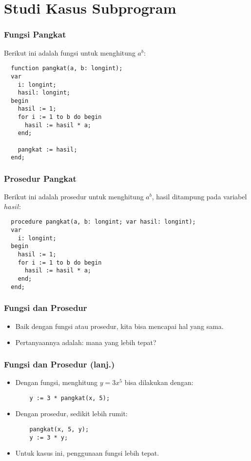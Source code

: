 \documentclass{beamer}
\begin{document}
\section{Studi Kasus Subprogram}
\frame{\sectionpage}

\begin{frame}[fragile]
\frametitle{Fungsi Pangkat}
Berikut ini adalah fungsi untuk menghitung $a^b$:
\begin{lstlisting}
  function pangkat(a, b: longint);
  var
    i: longint;
    hasil: longint;
  begin
    hasil := 1;
    for i := 1 to b do begin
      hasil := hasil * a;
    end;

    pangkat := hasil;
  end;
\end{lstlisting}
\end{frame}

\begin{frame}[fragile]
\frametitle{Prosedur Pangkat}
Berikut ini adalah prosedur untuk menghitung $a^b$, hasil ditampung pada variabel $hasil$:
\begin{lstlisting}
  procedure pangkat(a, b: longint; var hasil: longint);
  var
    i: longint;
  begin
    hasil := 1;
    for i := 1 to b do begin
      hasil := hasil * a;
    end;
  end;
\end{lstlisting}
\end{frame}

\begin{frame}[fragile]
\frametitle{Fungsi dan Prosedur}
\begin{itemize}
  \item Baik dengan fungsi atau prosedur, kita bisa mencapai hal yang sama.
  \item Pertanyaannya adalah: \alert{mana yang lebih tepat}?
\end{itemize}
\end{frame}

\begin{frame}[fragile]
\frametitle{Fungsi dan Prosedur (lanj.)}
\begin{itemize}
  \item Dengan fungsi, menghitung $y = 3x^5$ bisa dilakukan dengan:
  \begin{lstlisting}
    y := 3 * pangkat(x, 5);
  \end{lstlisting}

  \item Dengan prosedur, sedikit lebih rumit:
  \begin{lstlisting}
    pangkat(x, 5, y);
    y := 3 * y;
  \end{lstlisting}

  \item Untuk kasus ini, \alert{penggunaan fungsi lebih tepat}.
\end{itemize}
\end{frame}
\end{document}
